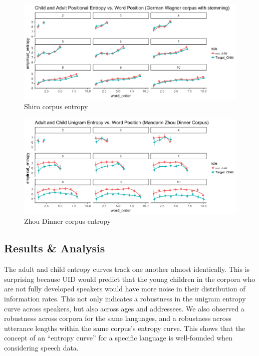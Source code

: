 \documentclass[10pt, letterpaper]{article}
\newenvironment{CodeChunk}{}{}
\begin{document}
\begin{CodeChunk}
\begin{figure}[h]

{\centering \includegraphics{figs/shiro_PE-1} 

}

\caption[Shiro corpus entropy]{Shiro corpus entropy}\label{fig:shiro_PE}
\end{figure}
\end{CodeChunk}

\begin{CodeChunk}
\begin{figure}[h]

{\centering \includegraphics{figs/zhou_PE-1} 

}

\caption[Zhou Dinner corpus entropy]{Zhou Dinner corpus entropy}\label{fig:zhou_PE}
\end{figure}
\end{CodeChunk}

\hypertarget{results-analysis}{%
\subsection{Results \& Analysis}\label{results-analysis}}

The adult and child entropy curves track one another almost identically.
This is surprising because UID would predict that the young children in
the corpora who are not fully developed speakers would have more noise
in their distribution of information rates. This not only indicates a
robustness in the unigram entropy curve across speakers, but also across
ages and addressees. We also observed a robustness across corpora for
the same languages, and a robustness across utterance lengths within the
same corpus's entropy curve. This shows that the concept of an ``entropy
curve'' for a specific language is well-founded when considering speech
data.
\end{document}
